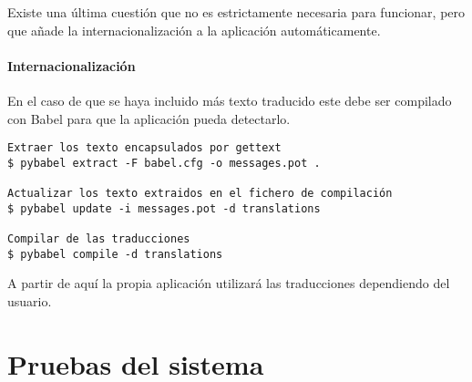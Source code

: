 Existe una última cuestión que no es estrictamente necesaria para funcionar, pero
que añade la internacionalización a la aplicación automáticamente.

\paragraph{Internacionalización} En el caso de que se haya incluido más texto
traducido este debe ser compilado con Babel para que la aplicación pueda
detectarlo.

\begin{tcolorbox}[colback=cyan!5!white,colframe=cyan!75!black,title=Proceso de internacionalización (desde /web)]
\begin{verbatim}
Extraer los texto encapsulados por gettext
$ pybabel extract -F babel.cfg -o messages.pot . 

Actualizar los texto extraidos en el fichero de compilación
$ pybabel update -i messages.pot -d translations

Compilar de las traducciones
$ pybabel compile -d translations 
\end{verbatim}
\end{tcolorbox}
 
A partir de aquí la propia aplicación utilizará las traducciones dependiendo del
usuario.

\clearpage
\section{Pruebas del sistema}
